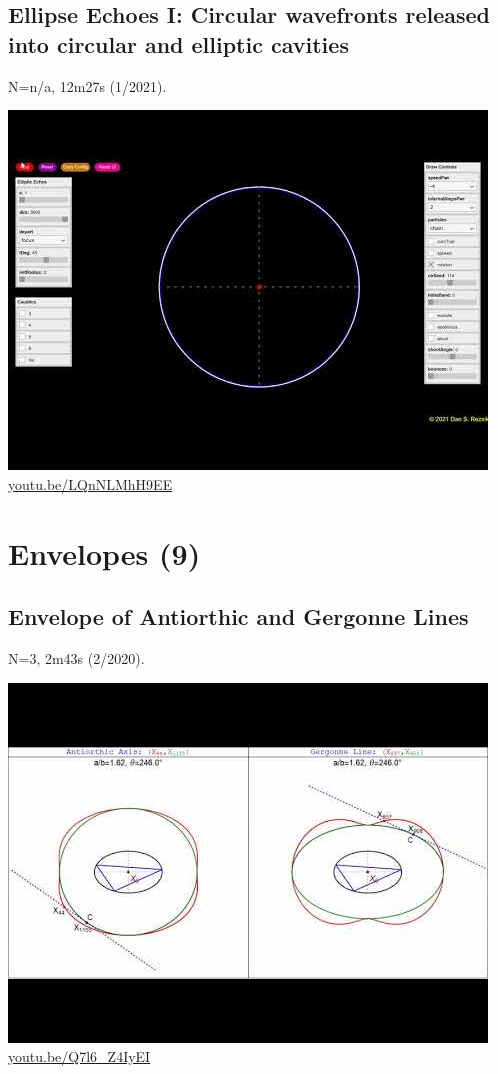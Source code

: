 \documentclass[12pt]{amsart}
\begin{document}
\subsection{Ellipse Echoes I: Circular wavefronts released into circular and elliptic cavities}
\label{vid:LQnNLMhH9EE}
\noindent N=n/a, 12m27s (1/2021). 
\begin{center}\includegraphics[width=.5\textwidth]{pics/LQnNLMhH9EE.jpg} \\ 
\href{https://youtu.be/LQnNLMhH9EE}{\url{youtu.be/LQnNLMhH9EE}}\end{center}
% 

\section{Envelopes (9)}

\subsection{Envelope of Antiorthic and Gergonne Lines}
\label{vid:Q7l6_Z4IyEI}
\noindent N=3, 2m43s (2/2020). 
\begin{center}\includegraphics[width=.5\textwidth]{pics/Q7l6_Z4IyEI.jpg} \\ 
\href{https://youtu.be/Q7l6_Z4IyEI}{\url{youtu.be/Q7l6\_Z4IyEI}}\end{center}
% 
\end{document}
